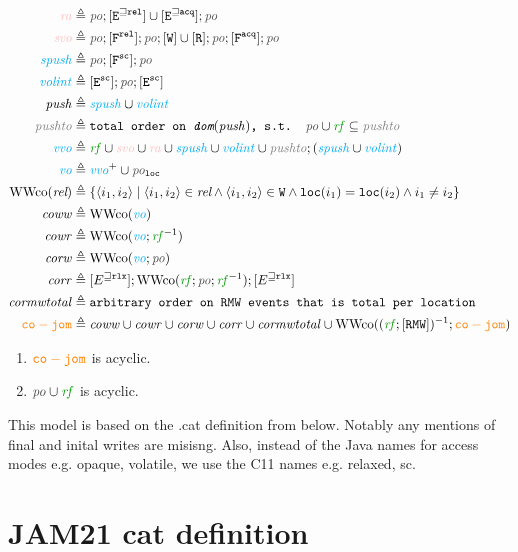 \documentclass{article}
\begin{document}
\begin{align*}
    \ra &\defeq \po ; [\lE^{\sqslq \rel}] \cup [\lE^{\sqslq \acq}] ; \po \\ 
    \svo &\defeq \po ; [\lF^{\rel}] ; \po ; [\lW] \cup [\lR] ; \po ; [\lF^\acq] ; \po \\
    \spush &\defeq \po ; [\lF^{\sco}] ; \po \\
    \volint &\defeq [\lE^\sco] ; \po ; [\lE^\sco] \\
    \push &\defeq \spush \cup \volint \\
    \pushto &\defeq \texttt{total order on $\dom{\push}$, s.t. $\po \cup \rf \subseteq \pushto$} \\
    \vvo &\defeq \rf \cup \svo \cup \ra \cup \spush \cup \volint \cup \pushto ; (\spush \cup \volint) \\
    \vo &\defeq \vvo^+ \cup \poloc \\
    \wwco{\textit{rel}} &\defeq \set{\tup{i_1, i_2} \st \tup{i_1, i_2} \in \textit{rel} \land \tup{i_1, i_2} \in \lW \land \loc(i_1) = \loc(i_2) \land i_1 \neq i_2} \\
    \coww &\defeq \wwco{\vo} \\
    \cowr &\defeq \wwco{\vo ; \rf^{-1}} \\
    \corw &\defeq \wwco{\vo ; \po} \\
    \corr &\defeq [E^{\sqslq \rlx}] ;  \wwco{\rf ; \po ; \rf^{-1}} ; [E^{\sqslq \rlx}] \\
    \cormwtotal &\defeq \texttt{arbitrary order on $\lU$ events that is total per location} \\ 
    \cojom &\defeq \coww \cup \cowr \cup \corw \cup \corr \cup \cormwtotal \cup \wwco{(\rf;[\lU])^{-1} ; \cojom}
\end{align*}

\begin{enumerate}
    \item $\cojom$ is acyclic. 
    \item $\po \cup \rf$ is acyclic.
\end{enumerate}

This model is based on the .cat definition from below. Notably any mentions of final and inital writes are misisng. Also, instead of the Java names for access modes e.g. opaque, volatile, we use the C11 names e.g. relaxed, sc.  

\section{JAM21 cat definition}
\end{document}
